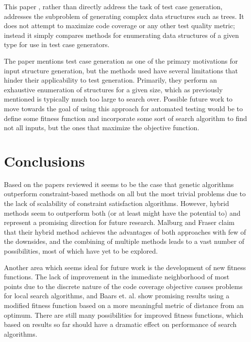 \documentclass{sig-alternate-05-2015}
\begin{document}
This paper \cite{sharma}, rather than directly address the task of test case
generation,
addresses the subproblem of generating complex data structures such as trees.
It does not attempt to maximize code coverage or any other test quality metric;
instead it simply compares methods for enumerating data structures of a given
type for use in test case generators.

The paper mentions test case generation as one of the primary motivations for
input structure generation, but the methods used have several limitations that
hinder their applicability to test generation. Primarily, they perform an
exhaustive enumeration of structures for a given size, which as previously
mentioned is typically much too large to search over. Possible future work to
move towards the goal of using this approach for automated testing would be to
define some fitness function and incorporate some sort of search algorithm to
find not all inputs, but the ones that maximize the objective function.

\section{Conclusions}

Based on the papers reviewed it seems to be the case that genetic algorithms
outperform constraint-based methods on all but the most trivial problems due to
the lack of scalability of constraint satisfaction algorithms. However, hybrid
methods seem to outperform both (or at least might have the potential to) and
represent a promising direction for future research. Malburg and Fraser claim
that their hybrid method achieves the advantages of both approaches with few of
the downsides, and the combining of multiple methods leads to a vast number of
possibilities, most of which have yet to be explored.

Another area which seems ideal for future work is the development of new
fitness functions. The lack of improvement in the immediate neighborhood of
most points due to the discrete nature of the code coverage objective causes
problems for local search algorithms, and Baars et. al. show promising results
using a modified fitness function based on a more meaningful metric of distance
from an optimum. There are still many possibilities for improved fitness
functions, which based on results so far should have a dramatic effect on
performance of search algorithms.



\end{document}
